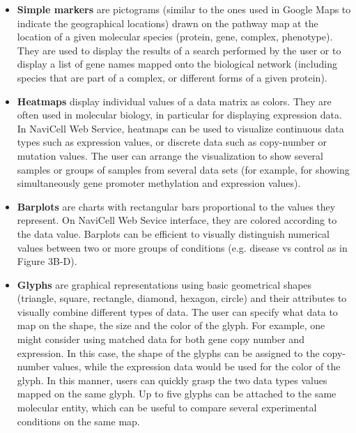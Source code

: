 \documentclass[a4,center,fleqn]{NAR}
\begin{document}
\begin{itemize}

\item \textbf{Simple markers} are pictograms (similar to the ones used in Google Maps
to indicate the geographical locations) drawn on the pathway map at the location
of a given molecular species (protein, gene, complex, phenotype). They are used to display the
results of a search performed by the user or to display a list of gene names 
mapped onto the biological network 
(including species that are part of a complex, or different forms of a given protein).

\item \textbf{Heatmaps} display individual values of a data matrix as
colors. They are often used in molecular biology, in particular for displaying expression
data. In NaviCell Web Service, heatmaps can be used to
visualize continuous data types such as expression values, or discrete data such
as copy-number or mutation values. The user can arrange the visualization to show
several samples or groups of samples from several data sets
(for example, for showing simultaneously gene promoter methylation and expression values).

\item \textbf{Barplots} are charts with rectangular bars proportional to the values
they represent. On NaviCell Web Sevice interface, they are colored according to the
data value. Barplots can be efficient to visually distinguish numerical
values between two or more groups of conditions (e.g. disease vs control as in Figure 3B-D).

\item \textbf{Glyphs} are graphical representations using basic geometrical
shapes (triangle, square, rectangle, diamond, hexagon, circle) and their attributes
to visually combine different types of data. The user can specify
what data to map on the shape, the size and the color of the glyph.
For example, one might consider using matched data for both
gene copy number and expression. In this case, the shape of the
glyphs can be assigned to the copy-number values, while the expression data
would be used for the color of the glyph. In this manner, users can quickly
grasp the two data types values mapped on the same glyph.
Up to five glyphs can be attached to the same molecular entity,
which can be useful to compare several experimental conditions on the same
map.


\end{itemize}
\end{document}
